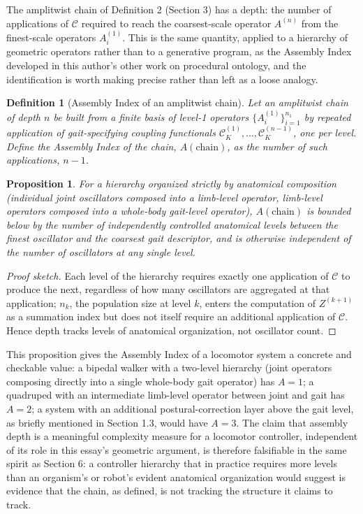 \documentclass[12pt]{article}
\newtheorem{definition}{Definition}
\newtheorem{proposition}{Proposition}
\begin{document}
The amplitwist chain of Definition 2 (Section 3) has a depth: the number of applications of $\mathcal{C}$ required to reach the coarsest-scale operator $A^{(n)}$ from the finest-scale operators $A^{(1)}_i$. This is the same quantity, applied to a hierarchy of geometric operators rather than to a generative program, as the Assembly Index developed in this author's other work on procedural ontology, and the identification is worth making precise rather than left as a loose analogy.

\begin{definition}[Assembly Index of an amplitwist chain]
Let an amplitwist chain of depth $n$ be built from a finite basis of level-1 operators $\{A^{(1)}_i\}_{i=1}^{n_1}$ by repeated application of gait-specifying coupling functionals $\mathcal{C}_K^{(1)}, \dots, \mathcal{C}_K^{(n-1)}$, one per level. Define the Assembly Index of the chain, $A(\text{chain})$, as the number of such applications, $n - 1$.
\end{definition}

\begin{proposition}
For a hierarchy organized strictly by anatomical composition (individual joint oscillators composed into a limb-level operator, limb-level operators composed into a whole-body gait-level operator), $A(\text{chain})$ is bounded below by the number of independently controlled anatomical levels between the finest oscillator and the coarsest gait descriptor, and is otherwise independent of the number of oscillators at any single level.
\end{proposition}

\begin{proof}[Proof sketch]
Each level of the hierarchy requires exactly one application of $\mathcal{C}$ to produce the next, regardless of how many oscillators are aggregated at that application; $n_k$, the population size at level $k$, enters the computation of $Z^{(k+1)}$ as a summation index but does not itself require an additional application of $\mathcal{C}$. Hence depth tracks levels of anatomical organization, not oscillator count.
\end{proof}

This proposition gives the Assembly Index of a locomotor system a concrete and checkable value: a bipedal walker with a two-level hierarchy (joint operators composing directly into a single whole-body gait operator) has $A = 1$; a quadruped with an intermediate limb-level operator between joint and gait has $A = 2$; a system with an additional postural-correction layer above the gait level, as briefly mentioned in Section 1.3, would have $A = 3$. The claim that assembly depth is a meaningful complexity measure for a locomotor controller, independent of its role in this essay's geometric argument, is therefore falsifiable in the same spirit as Section 6: a controller hierarchy that in practice requires more levels than an organism's or robot's evident anatomical organization would suggest is evidence that the chain, as defined, is not tracking the structure it claims to track.
\end{document}
